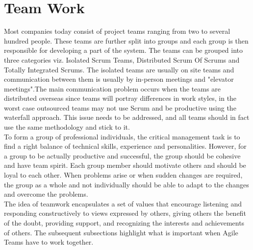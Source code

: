 \documentclass[sigplan,screen]{acmart}
\begin{document}
 
\section{Team Work}
Most companies today consist of project teams ranging from two to several hundred people. These teams are further split into groups and each group is then responsible for developing a part of the system. The teams can be grouped into three categories viz. Isolated Scrum Teams, Distributed Scrum Of Scrums and Totally Integrated Scrums\cite{Jeff}. The isolated teams are usually on site teams and communication between them is usually by in-person meetings and "elevator meetings".The main communication problem occurs when the teams are distributed overseas since teams will portray differences in work styles, in the worst case outsourced teams may not use Scrum and be productive using the waterfall approach. This issue needs to be addressed, and all teams should in fact use the same methodology and stick to it.\\
To form a group of professional individuals, the critical management task is to find a right balance of technical skills, experience and personalities. However, for a group to be actually productive and successful, the group should be cohesive and have team spirit\cite{ian}. Each group member should motivate others and should be loyal to each other. When problems arise or when sudden changes are required, the group as a whole and not individually should be able to adapt to the changes and overcome the problems.\\
The idea of teamwork encapsulates a set of values that encourage listening and responding constructively to views expressed by others, giving others the benefit of the doubt, providing support, and recognizing the interests and achievements of others\cite{Moe}.
The subsequent subsections highlight what is important when Agile Teams have to work together. 
\end{document}
